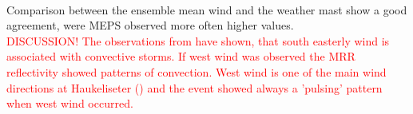 \\
Comparison between the ensemble mean wind and the weather mast show a good agreement, were MEPS observed more often higher values. 
\\
\textcolor{red}{DISCUSSION! The observations from  have shown, that south easterly wind is associated with convective storms. If west wind was observed the MRR reflectivity showed patterns of convection. West wind is one of the main wind directions at Haukeliseter () and the event showed always a 'pulsing' pattern when west wind occurred.  }
























